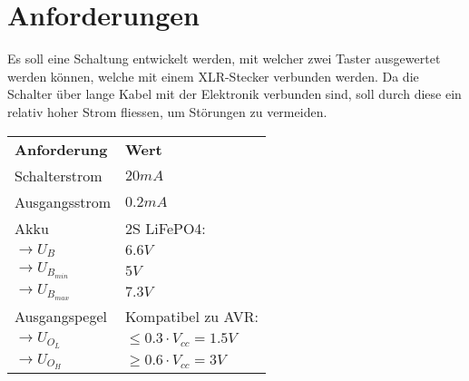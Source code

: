 
\section{Anforderungen}
Es soll eine Schaltung entwickelt werden, mit welcher zwei Taster ausgewertet werden können, welche mit einem XLR-Stecker verbunden werden. Da die Schalter über lange Kabel mit der Elektronik verbunden sind, soll durch diese ein relativ hoher Strom fliessen, um Störungen zu vermeiden. 

\begin{table}[h!]
  \begin{tabular}{@{}ll}
    \textbf{Anforderung}        & \textbf{Wert} \\
    Schalterstrom               & $20 mA$ \\
    Ausgangsstrom               & $0.2 mA$ \\
    Akku                        & 2S LiFePO4: \\
    $\rightarrow U_B$           & $6.6 V$ \\
    $\rightarrow U_{B_{min}}$   & $5 V$ \\
    $\rightarrow U_{B_{max}}$   & $7.3 V$ \\
    Ausgangspegel               & Kompatibel zu AVR: \\
    $\rightarrow U_{O_L}$       & $\leq 0.3 \cdot V_{cc} = 1.5 V$ \\
    $\rightarrow U_{O_H}$       & $\geq 0.6 \cdot V_{cc} = 3 V$ \\
    
  \end{tabular}
\end{table}


